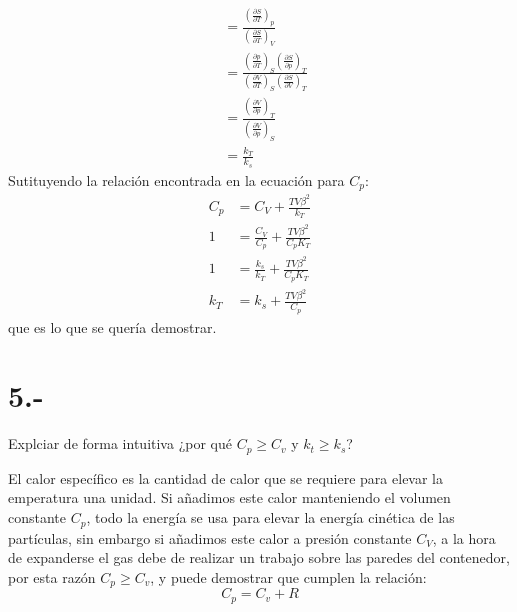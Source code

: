 \documentclass{article}
\begin{document}
\begin{tcolorbox}[breakable]
\begin{align*}
        &= \frac{(\tfrac{\partial S}{\partial T})_p}{(\tfrac{\partial S}{\partial T})_V} \\
        &= \frac{(\tfrac{\partial p}{\partial T})_S (\tfrac{\partial S}{\partial p})_T}{(\tfrac{\partial V}{\partial T})_S (\tfrac{\partial S}{\partial V})_T} \\
        &= \frac{(\tfrac{\partial V}{\partial p})_T}{(\tfrac{\partial V}{\partial p})_S} \\
        &= \frac{k_T}{k_s}
    \end{align*}
    Sutituyendo la relación encontrada en la ecuación para $C_p$:
    \begin{align*}
        C_p &= C_V + \tfrac{TV\beta^2}{k_T} \\
        1 &= \tfrac{C_V}{C_p} + \tfrac{TV\beta^2}{C_pK_T} \\
        1 &= \tfrac{k_s}{k_T} + \tfrac{TV\beta^2}{C_pK_T} \\
        k_T &= k_s + \tfrac{TV\beta^2}{C_p}
    \end{align*}
    que es lo que se quería demostrar.
\end{tcolorbox}

\section*{5.-}
Explciar de forma intuitiva ¿por qué $C_p \geq C_v$ y $k_t \geq k_s$?
\begin{tcolorbox}[breakable]
    El calor específico es la cantidad de calor que se requiere para elevar la emperatura una unidad. 
    Si añadimos este calor manteniendo el volumen constante $C_p$, todo la energía se usa para elevar la energía cinética de las partículas, 
    sin embargo si añadimos este calor a presión constante $C_V$, a la hora de expanderse el gas debe de realizar un trabajo sobre las paredes del 
    contenedor, por esta razón $C_p \geq C_v$, y puede demostrar que cumplen la relación:
    \[ C_p = C_v + R \]

\end{tcolorbox}
\end{document}
